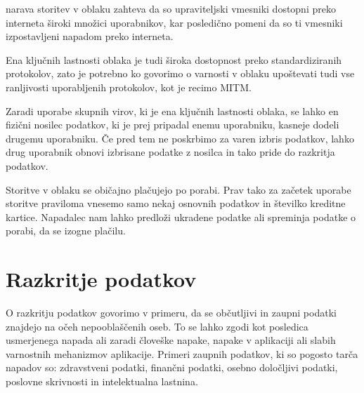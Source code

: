 \documentclass[12pt,a4paper,openany,tikz]{book}
\theoremstyle{plain}
\theoremstyle{definition}
\begin{document}
\begin{description}[style=nextline]

\item[Nedovoljen dostop do upraviteljskega in programskega vmesnika] narava storitev v oblaku zahteva da so upraviteljski vmesniki dostopni preko interneta široki množici uporabnikov, kar posledično pomeni da so ti vmesniki izpostavljeni napadom preko interneta.

\item[Ranljivosti Internetnega protokola] Ena ključnih lastnosti oblaka je tudi široka dostopnost preko standardiziranih protokolov, zato je potrebno ko govorimo o varnosti v oblaku upoštevati tudi vse ranljivosti uporabljenih protokolov, kot je recimo \gls{MITM}.

\item[Ranljivosti obnovitve podatkov] Zaradi uporabe skupnih virov, ki je ena ključnih lastnosti oblaka, se lahko en fizični nosilec podatkov, ki je prej pripadal enemu uporabniku, kasneje dodeli drugemu uporabniku. Če pred tem ne poskrbimo za varen izbris podatkov, lahko drug uporabnik obnovi izbrisane podatke z nosilca in tako pride do razkritja podatkov.

\item[Izogibanje merjenju in plačilu] Storitve v oblaku se običajno plačujejo po porabi. Prav tako za začetek uporabe storitve praviloma vnesemo samo nekaj osnovnih podatkov in številko kreditne kartice. Napadalec nam lahko predloži ukradene podatke ali spreminja podatke o porabi, da se izogne plačilu.

\end{description}


\section{Razkritje podatkov}
\label{sub:Razkritje podatkov}

O razkritju podatkov govorimo v primeru, da se občutljivi in zaupni podatki znajdejo na očeh nepooblaščenih oseb.  To se lahko zgodi kot posledica usmerjenega napada ali zaradi človeške napake, napake v aplikaciji ali slabih varnostnih mehanizmov aplikacije. Primeri zaupnih podatkov, ki so pogosto tarča napadov so: zdravstveni podatki, finančni podatki, osebno določljivi podatki, poslovne skrivnosti in intelektualna lastnina.
\end{document}
